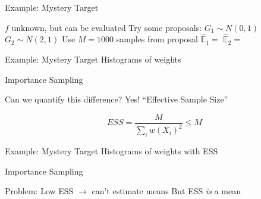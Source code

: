 \documentclass[14pt]{beamer}
\newcommand{\bE}{\mathbb{E}}
\begin{document}
\begin{frame}{Example: Mystery Target}
    \begin{outline}
        \1 $f$ unknown, but can be evaluated \newline
        \1 Try some proposals:
            \2 $G_1 \sim N(0,1)$
            \2 $G_2 \sim N(2,1)$ \newline
        \1 Use $M=1000$ samples from proposal
            \2 $\hat{\bE}_1 = $
            \2 $\hat{\bE}_2 = $
    \end{outline}    
\end{frame}

\begin{frame}{Example: Mystery Target}
    Histograms of weights
\end{frame}

\begin{frame}{Importance Sampling}
    \begin{outline}
        \1 Can we quantify this difference?
            \2 Yes!
        \1 ``Effective Sample Size''
    \end{outline}
    \begin{equation*}
        ESS = \frac{M}{\sum_i w(X_i)^2} \leq M
    \end{equation*}
\end{frame}

\begin{frame}{Example: Mystery Target}
    Histograms of weights with ESS
\end{frame}

\begin{frame}{Importance Sampling}
    \begin{outline}
        \1 Problem: Low ESS $\rightarrow$ can't estimate means \newline
        \1 But ESS \textit{is} a mean
            \2 \citep{Cha18}
    \end{outline}
\end{frame}


\end{document}
